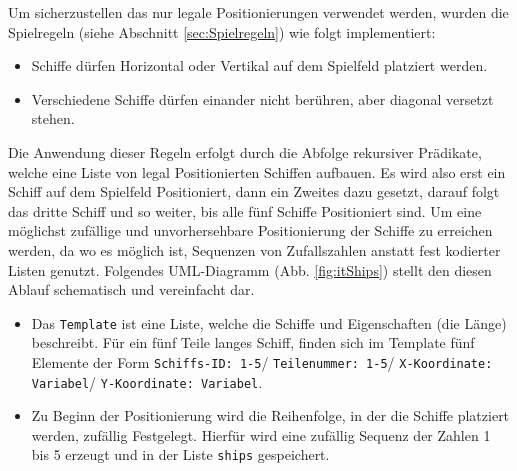 	Um sicherzustellen das nur legale Positionierungen verwendet werden, wurden die Spielregeln (siehe Abschnitt \ref{sec:Spielregeln}) wie folgt implementiert:
	\begin{itemize}
		\item Schiffe dürfen Horizontal oder Vertikal auf dem Spielfeld platziert werden.\newline
		\lstset{language=Prolog,caption=Implementierung der Platzierungsregel in Prolog,label=code:PrologRules1,	   
		inputencoding=latin1,extendedchars=true,basicstyle=\footnotesize,numbers=left,numberstyle=\footnotesize}
		
		\item Verschiedene Schiffe dürfen einander nicht berühren, aber diagonal versetzt stehen.
		\lstset{language=Prolog,caption=Implementierung der Platzierungsregel in Prolog,label=code:PrologRules2,	   
		inputencoding=latin1,extendedchars=true,basicstyle=\footnotesize,numbers=left,numberstyle=\footnotesize}
		
	\end{itemize}
	Die Anwendung dieser Regeln erfolgt durch die Abfolge rekursiver Prädikate, welche eine Liste von legal Positionierten Schiffen aufbauen. Es wird also 
	erst ein Schiff auf dem Spielfeld Positioniert, dann ein Zweites dazu gesetzt, darauf folgt das dritte Schiff und so weiter, bis alle fünf Schiffe Positioniert 
	sind. Um eine möglichst zufällige und unvorhersehbare Positionierung der Schiffe zu erreichen werden, da wo es möglich ist, Sequenzen von Zufallszahlen anstatt 
	fest kodierter Listen genutzt. Folgendes UML-Diagramm (Abb. \ref{fig:itShips}) stellt den diesen Ablauf schematisch und vereinfacht dar.
	\begin{itemize}
		\item Das \texttt{Template} ist eine Liste, welche die Schiffe und Eigenschaften (die Länge) beschreibt. Für ein fünf Teile langes Schiff, finden sich im 
		Template fünf Elemente der Form \texttt{Schiffs-ID: 1-5}/ \texttt{Teilenummer: 1-5}/ \texttt{X-Koordinate: Variabel}/ \texttt{Y-Koordinate: Variabel}.
		\item Zu Beginn der Positionierung wird die Reihenfolge, in der die Schiffe platziert werden, zufällig Festgelegt. Hierfür wird eine zufällig Sequenz der 
		Zahlen 1 bis 5 erzeugt und in der Liste \texttt{ships} gespeichert.
	\end{itemize}
